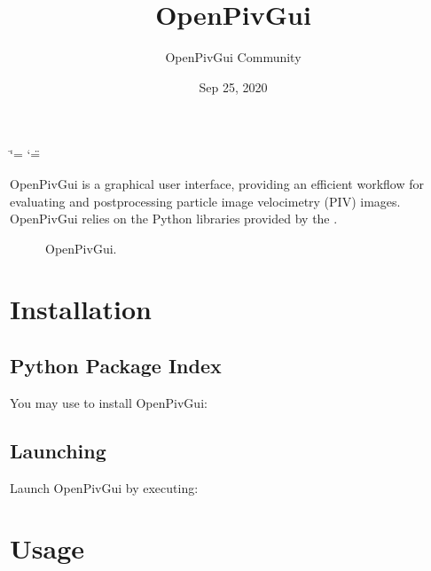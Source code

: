 \documentclass[letterpaper,10pt,english]{sphinxmanual}
\title{OpenPivGui}
\date{Sep 25, 2020}
\author{OpenPivGui Community}
\begin{document}
\ifdefined\shorthandoff
  \ifnum\catcode`\=\string=\active\shorthandoff{=}\fi
  \ifnum\catcode`\"=\active{}\fi
\fi

\pagestyle{empty}
\sphinxmaketitle
\pagestyle{plain}
\sphinxtableofcontents
\pagestyle{normal}
\label{\detokenize{index::doc}}


OpenPivGui is a graphical user interface, providing an efficient workflow for evaluating and postprocessing particle image velocimetry (PIV) images. OpenPivGui relies on the Python libraries provided by the .

\begin{figure}[htbp]
\centering
\capstart

\noindent{}
\caption{OpenPivGui.}\label{\detokenize{index:id1}}\end{figure}


\chapter{Installation}
\label{\detokenize{installation:installation}}\label{\detokenize{installation::doc}}

\section{Python Package Index}
\label{\detokenize{installation:python-package-index}}
You may use  to install OpenPivGui:

\begin{sphinxVerbatim}[commandchars=\\\{\}]
  
\end{sphinxVerbatim}


\section{Launching}
\label{\detokenize{installation:launching}}
Launch OpenPivGui by executing:

\begin{sphinxVerbatim}[commandchars=\\\{\}]
  
\end{sphinxVerbatim}


\chapter{Usage}
\label{\detokenize{usage:usage}}\label{\detokenize{usage::doc}}
\end{document}
